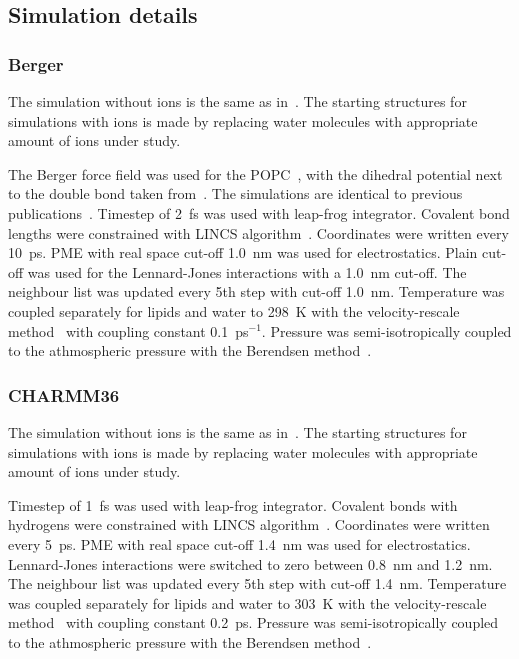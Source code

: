 \documentclass[pre,aps,floatfix,authordate1-4,twocolumn]{revtex4-1}
\begin{document}


\subsection{Simulation details}
\subsubsection{Berger}
The simulation without ions is the same as in~\cite{botan15}. The starting structures for simulations with ions is
made by replacing water molecules with appropriate amount of ions under study.

The Berger force field was used for the POPC~\cite{berger97}, with the dihedral potential next to the double bond 
taken from~\cite{bachar04}. The simulations are identical to previous publications~\cite{ollila07a,ferreira13,ferreira15}.
Timestep of 2~fs was used with leap-frog integrator. Covalent bond lengths were constrained with LINCS algorithm~\cite{hess97,hess07}. 
Coordinates were written every 10~ps. PME with real space cut-off 1.0~nm was used 
for electrostatics. Plain cut-off was used for the Lennard-Jones interactions with a 1.0~nm cut-off.
The neighbour list was updated every 5th step with cut-off 1.0~nm. Temperature was coupled separately
for lipids and water to 298~K with the velocity-rescale method~\cite{bussi07} with coupling constant 0.1~ps$^{-1}$.
Pressure was semi-isotropically coupled to the athmospheric pressure with the Berendsen method~\cite{berendsen84}.


\subsubsection{CHARMM36}
The simulation without ions is the same as in~\cite{botan15}. The starting structures for simulations with ions is
made by replacing water molecules with appropriate amount of ions under study.

Timestep of 1~fs was used with leap-frog integrator. Covalent bonds with hydrogens were constrained with LINCS algorithm~\cite{hess97,hess07}. 
Coordinates were written every 5~ps. PME with real space cut-off 1.4~nm was used 
for electrostatics. Lennard-Jones interactions were switched to zero between 0.8~nm and 1.2~nm.
The neighbour list was updated every 5th step with cut-off 1.4~nm. Temperature was coupled separately
for lipids and water to 303~K with the velocity-rescale method~\cite{bussi07} with coupling constant 0.2~ps.
Pressure was semi-isotropically coupled to the athmospheric pressure with the Berendsen method~\cite{berendsen84}.
\end{document}
